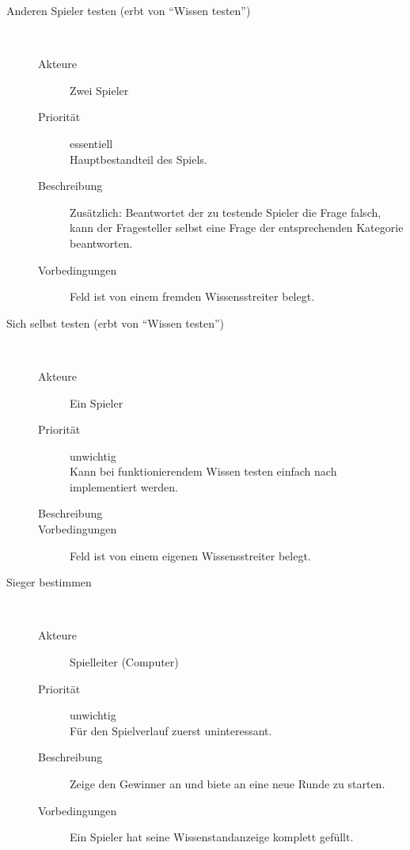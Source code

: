 \documentclass{report}
\begin{document}
\begin{description}
   \item[Anderen Spieler testen (erbt von "`Wissen testen"')]~\par
   \begin{description}
      \item[Akteure] Zwei Spieler
      \item[Priorität] essentiell\\Hauptbestandteil des Spiels.
      \item[Beschreibung] Zusätzlich: Beantwortet der zu testende Spieler die Frage falsch, kann der Fragesteller selbst eine Frage der entsprechenden Kategorie beantworten.
      \item[Vorbedingungen] Feld ist von einem fremden Wissensstreiter belegt.
   \end{description}


   \item[Sich selbst testen (erbt von "`Wissen testen"')]~\par
   \begin{description}
      \item[Akteure] Ein Spieler
      \item[Priorität] unwichtig\\Kann bei funktionierendem Wissen testen einfach nach implementiert werden.
      \item[Beschreibung]
      \item[Vorbedingungen] Feld ist von einem eigenen Wissensstreiter belegt.
   \end{description}


   \item[Sieger bestimmen]~\par
   \begin{description}
      \item[Akteure] Spielleiter (Computer)
      \item[Priorität] unwichtig\\Für den Spielverlauf zuerst uninteressant.
      \item[Beschreibung] Zeige den Gewinner an und biete an eine neue Runde zu starten.
      \item[Vorbedingungen] Ein Spieler hat seine Wissenstandanzeige komplett gefüllt.
   \end{description}
\end{description}
\end{document}
